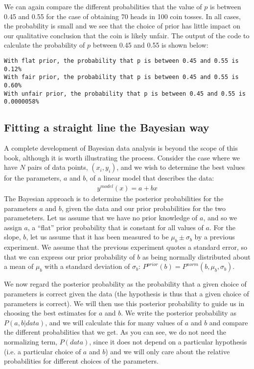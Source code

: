 
We can again compare the different probabilities that the value of $p$ is between 0.45 and 0.55 for the case of obtaining 70 heads in 100 coin tosses. In all cases, the probability is small and we see that the choice of prior has little impact on our qualitative conclusion that the coin is likely unfair. The output of the code to calculate the probability of $p$ between 0.45 and 0.55 is shown below:
\begin{verbatim}
With flat prior, the probability that p is between 0.45 and 0.55 is 0.12%
With fair prior, the probability that p is between 0.45 and 0.55 is 0.60%
With unfair prior, the probability that p is between 0.45 and 0.55 is 0.0000058%
\end{verbatim}

\subsection{Fitting a straight line the Bayesian way}
A complete development of Bayesian data analysis is beyond the scope of this book, although it is worth illustrating the process. Consider the case where we have $N$ pairs of data points, $(x_i,y_i)$, and we wish to determine the best values for the parameters, $a$ and $b$, of a linear model that describes the data:
\begin{align*}
y^{model}(x) = a+bx
\end{align*}
The Bayesian approach is to determine the posterior probabilities for the parameters $a$ and $b$, given the data and our prior probabilities for the two parameteters. Let us assume that we have no prior knowledge of $a$, and so we assign $a$, a ``flat'' prior probability that is constant for all values of $a$.  For the slope, $b$, let us assume that it has been measured to be  $\mu_b\pm\sigma_b$ by a previous experiment. We assume that the previous experiment quotes a standard error, so that we can express our prior probability of $b$ as being normally distributed about a mean of $\mu_b$ with a standard deviation of $\sigma_b$: $P^{prior}(b)=P^{norm}(b,\mu_b,\sigma_b)$.

We now regard the posterior probability as the probability that a given choice of parameters is correct given the data (the hypothesis is thus that a given choice of parameters is correct). We will then use this posterior probability to guide us in choosing the best estimates for $a$ and $b$. We write the posterior probability as $P(a,b|data)$, and we will calculate this for many values of $a$ and $b$ and compare the different probabilities that we get. As you can see, we do not need the normalizing term, $P(data)$, since it does not depend on a particular hypothesis (i.e. a particular choice of $a$ and $b$) and we will only care about the relative probabilities for different choices of the parameters.

